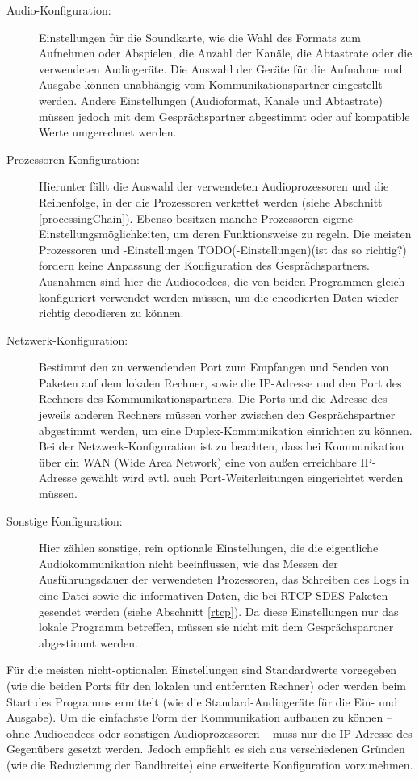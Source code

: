\begin{description}
\item[Audio-Konfiguration:]Einstellungen für die Soundkarte, wie die Wahl des Formats zum Aufnehmen oder Abspielen, die Anzahl der Kanäle, die Abtastrate oder die verwendeten Audiogeräte. Die Auswahl der Geräte für die Aufnahme und Ausgabe können unabhängig vom Kommunikationspartner eingestellt werden. Andere Einstellungen (Audioformat, Kanäle und Abtastrate) müssen jedoch mit dem Gesprächspartner abgestimmt oder auf kompatible Werte umgerechnet werden.
\item[Prozessoren-Konfiguration:]Hierunter fällt die Auswahl der verwendeten Audioprozessoren und die Reihenfolge, in der die Prozessoren verkettet werden (siehe Abschnitt \ref{processingChain}). Ebenso besitzen manche Prozessoren eigene Einstellungsmöglichkeiten, um deren Funktionsweise zu regeln. Die meisten Prozessoren und -Einstellungen TODO(-Einstellungen)(ist das so richtig?) fordern keine Anpassung der Konfiguration des Gesprächspartners. Ausnahmen sind hier die Audiocodecs, die von beiden Programmen gleich konfiguriert verwendet werden müssen, um die encodierten Daten wieder richtig decodieren zu können.
\item[Netzwerk-Konfiguration:]Bestimmt den zu verwendenden Port zum Empfangen und Senden von Paketen auf dem lokalen Rechner, sowie die IP-Adresse und den Port des Rechners des Kommunikationspartners. Die Ports und die Adresse des jeweils anderen Rechners müssen vorher zwischen den Gesprächspartner abgestimmt werden, um eine Duplex-Kommunikation einrichten zu können. Bei der Netzwerk-Konfiguration ist zu beachten, dass bei Kommunikation über ein WAN (Wide Area Network) eine von außen erreichbare IP-Adresse gewählt wird evtl. auch Port-Weiterleitungen eingerichtet werden müssen.
\item[Sonstige Konfiguration:] Hier zählen sonstige, rein optionale Einstellungen, die die eigentliche Audiokommunikation nicht beeinflussen, wie das Messen der Ausführungsdauer der verwendeten Prozessoren, das Schreiben des Logs in eine Datei sowie die informativen Daten, die bei RTCP SDES-Paketen gesendet werden (siehe Abschnitt \ref{rtcp}). Da diese Einstellungen nur das lokale Programm betreffen, müssen sie nicht mit dem Gesprächspartner abgestimmt werden.
\end{description}
Für die meisten nicht-optionalen Einstellungen sind Standardwerte vorgegeben (wie die beiden Ports für den lokalen und entfernten Rechner) oder werden beim Start des Programms ermittelt (wie die Standard-Audiogeräte für die Ein- und Ausgabe). Um die einfachste Form der Kommunikation aufbauen zu können -- ohne Audiocodecs oder sonstigen Audioprozessoren -- muss nur die IP-Adresse des Gegenübers gesetzt werden. Jedoch empfiehlt es sich aus verschiedenen Gründen (wie die Reduzierung der Bandbreite) eine erweiterte Konfiguration vorzunehmen.
